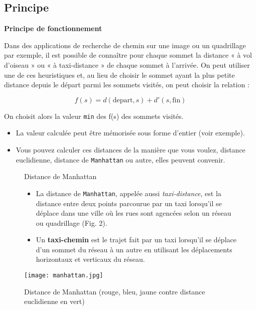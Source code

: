 \subsection{Principe}


\begin{prop}\textbf{Principe de fonctionnement}

Dans des applications de recherche de chemin sur une image ou un quadrillage par exemple, il est possible de connaître pour chaque sommet la distance « à vol d'oiseau » ou « à taxi-distance » de chaque sommet à l'arrivée. On peut utiliser une de ces heuristiques et, au lieu de choisir le sommet ayant la plus petite distance depuis le départ parmi les sommets visités, on peut choisir la relation :


$$f(s)=d(\text{depart},s)+d'(s,\text{fin}) $$

On choisit alors la valeur \texttt{min} des f(s) des sommets visités.

\end{prop}

\begin{rem}
\begin{itemize}
\item La valeur calculée peut être mémorisée sous forme d'entier (voir exemple).
\item Vous pouvez calculer ces distances de la manière que vous voulez, distance euclidienne, distance de \texttt{Manhattan} ou autre, elles peuvent convenir.\\
\end{itemize}
\end{rem}


\begin{figure}[!h]
\begin{minipage}{0.6\textwidth}
\begin{defi}{Distance de Manhattan}
\begin{itemize}
\item La distance de \texttt{Manhattan}, appelée aussi \textit{taxi-distance}, est la distance entre deux points parcourue par un taxi lorsqu'il se déplace dans une ville où les rues sont agencées selon un réseau ou quadrillage (Fig. 2). 
\item Un \textbf{taxi-chemin} est le trajet fait par un taxi lorsqu'il se déplace d'un sommet du réseau à un autre en utilisant les déplacements horizontaux et verticaux du réseau.
\end{itemize}

\end{defi}
\end{minipage}
\begin{minipage}{0.4\textwidth}
\begin{center}
\texttt{[image: manhattan.jpg]}
\caption{Distance de Manhattan (rouge, bleu, jaune contre distance euclidienne en vert)}
\end{center}
\end{minipage}
\end{figure}


